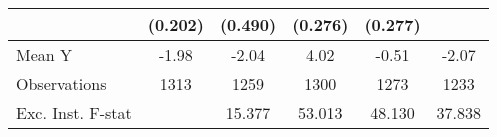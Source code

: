 {\begin{tabular}{l*{5}{c}}
            &     (0.202)         &     (0.490)         &     (0.276)         &     (0.277)         &                     \\
\midrule
Mean Y      &       -1.98         &       -2.04         &        4.02         &       -0.51         &       -2.07         \\
Observations&        1313         &        1259         &        1300         &        1273         &        1233         \\
Exc. Inst. F-stat&                     &      15.377         &      53.013         &      48.130         &      37.838         \\
\bottomrule
\end{tabular}
}
